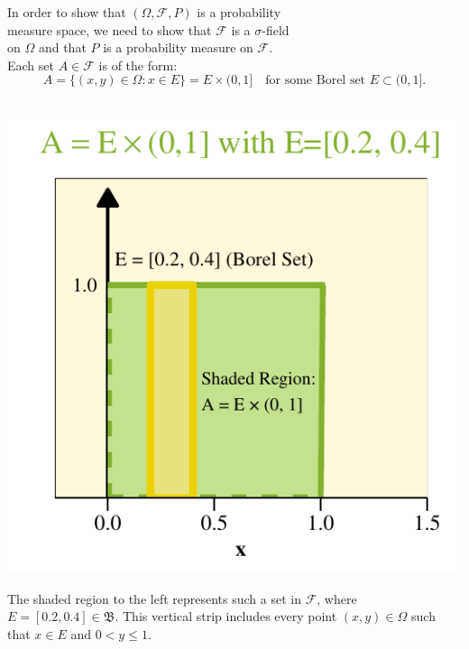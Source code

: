 \begin{proofline}
   In order to show that $(\Omega, \mathcal{F}, P)$ is a probability\\[-2pt]
   measure space, we need to show that $\mathcal{F}$ is a $\sigma$-field\\[-2pt]
   on $\Omega$ and that $P$ is a probability measure on $\mathcal{F}$.\\[-5pt]
   
   Each set $A \in \mathcal{F}$ is of the form:
    \[
    A = \{(x, y) \in \Omega : x \in E \} = E \times (0,1] \quad \text{for some Borel set } E \subset (0,1].
    \]
       \\
       

\vspace{-5ex}
\begin{minipage}[t]{0.39\textwidth}
  \vspace{-2ex}
  \includegraphics[width=\linewidth]{selected-square.pdf}
  \vspace{-2ex}
\end{minipage}%
\hfill
\begin{minipage}[t]{0.59\textwidth}

    The shaded region to the left represents such a set in $\mathcal{F}$, where
    $E = [0.2, 0.4] \in \mathfrak{B}$. This vertical strip includes every point
    $(x, y) \in \Omega$ such that $x \in E$ and $0 < y \leq 1$.\\[5pt]


\end{minipage}
\end{proofline}
